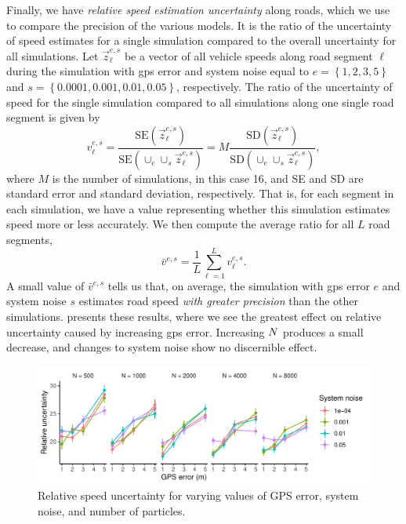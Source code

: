 Finally, we have \emph{relative speed estimation uncertainty} along roads, which we use to compare the precision of the various models. It is the ratio of the uncertainty of speed estimates for a single simulation compared to the overall uncertainty for all simulations. Let $\vec z_\ell^{e,s}$ be a vector of all vehicle speeds along road segment $\ell$ during the simulation with \gls{gps} error and system noise equal to $e=\left\{ 1, 2, 3, 5 \right\}$ and $s=\left\{ 0.0001, 0.001, 0.01, 0.05 \right\}$, respectively. The ratio of the uncertainty of speed for the single simulation compared to all simulations along one single road segment is given by
\begin{equation}
\label{eq:rel_speed_var_ratio}
v_\ell^{e,s} =
\frac{
    \mathrm{SE}(\vec z_\ell^{e,s})
}{
    \mathrm{SE}(\cup_e\cup_s \vec z_\ell^{e,s})
} =
M \frac{
    \mathrm{SD}(\vec z_\ell^{e,s})
}{
    \mathrm{SD}(\cup_e\cup_s \vec z_\ell^{e,s})
},
\end{equation}
where $M$ is the number of simulations, in this case 16,
and SE and SD are standard error and standard deviation, respectively.
That is, for each segment in each simulation, we have a value representing whether this simulation estimates speed more or less accurately. We then compute the average ratio for all $L$ road segments,
\begin{equation}
\label{eq:rel_speed_var}
\bar v^{e,s} = \frac{1}{L} \sum_{\ell=1}^L v_\ell^{e,s}.
\end{equation}
A small value of $\bar v^{e,s}$ tells us that, on average, the simulation with \gls{gps} error $e$ and system noise $s$ estimates road speed \emph{with greater precision} than the other simulations.  presents these results, where we see the greatest effect on relative uncertainty caused by increasing \gls{gps} error. Increasing $N$ produces a small decrease, and changes to system noise show no discernible effect.


\begin{knitrout}\small
{}\color{fgcolor}\begin{figure}

{\centering \includegraphics[width=\textwidth]{figure/model_performance_var-1} 

}

\caption[Relative speed uncertainty for varying values of GPS error, system noise, and number of particles]{Relative speed uncertainty for varying values of GPS error, system noise, and number of particles.}\label{fig:model_performance_var}
\end{figure}


\end{knitrout}


